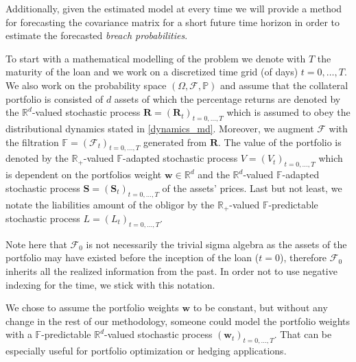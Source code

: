 \documentclass[a4paper, oneside]{discothesis}
\begin{document}
 Additionally, given the estimated model at every time we will provide a method for forecasting the covariance matrix for a short future time horizon in order to estimate the forecasted \textit{breach probabilities}.

To start with a mathematical modelling of the problem we denote with $T$ the maturity of the loan and we work on a discretized time grid (of days) $t = 0, \dots, T$. We also work on the probability space $(\Omega, \mathcal{F}, \mathbb{P})$ and assume that the collateral portfolio is consisted of $d$ assets of which the percentage returns are denoted by the $\mathbb{R}^d$-valued stochastic process $\mathbf{R} = (\mathbf{R}_t)_{t = 0, \dots, T}$ which is assumed to obey the distributional dynamics stated in \ref{dynamics_md}. Moreover, we augment $\mathcal{F}$ with the filtration $\mathbb{F}=(\mathcal{F}_t)_{t = 0, \dots, T}$ generated from $\mathbf{R}$. The value of the portfolio is denoted by the $\mathbb{R}_+$-valued $\mathbb{F}$-adapted stochastic process $V = (V_t)_{t=0, \dots, T}$ which is dependent on the portfolios weight $\mathbf{w}\in \mathbb{R}^d$ and the $\mathbb{R}^d$-valued $\mathbb{F}$-adapted stochastic process $\mathbf{S} = (\mathbf{S}_t)_{t=0, \dots, T}$ of the assets' prices. Last but not least, we notate the liabilities amount of the obligor by the $\mathbb{R}_+$-valued $\mathbb{F}$-predictable stochastic process $L = (L_t)_{t=0, \dots, T}$.

\begin{mdframed}
\begin{remark}
Note here that $\mathcal{F}_0$ is not necessarily the trivial sigma algebra as the assets of the portfolio may have existed before the inception of the loan ($t=0$), therefore $\mathcal{F}_0$ inherits all the realized information from the past. In order not to use negative indexing for the time, we stick with this notation. 
\end{remark}
\end{mdframed}

\begin{mdframed}
\begin{remark}\label{weights}
We chose to assume the portfolio weights $\mathbf{w}$ to be constant, but without any change in the rest of our methodology, someone could model the portfolio weights with a $\mathbb{F}$-predictable $\mathbb{R}^d$-valued stochastic process $(\mathbf{w}_t)_{t = 0, \dots, T}$. That can be especially useful for portfolio optimization or hedging applications.
\end{remark}
\end{mdframed}
\end{document}
